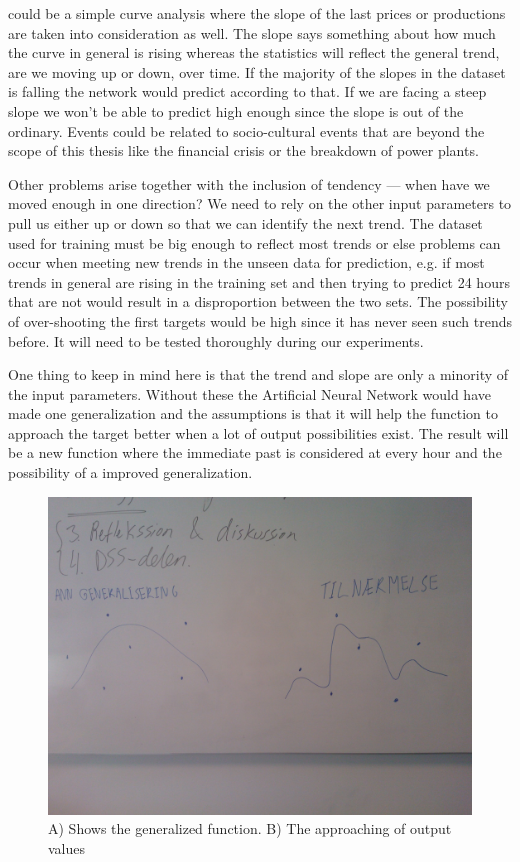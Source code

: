could be a simple curve analysis where the slope of the last prices or productions are taken into consideration as well. The slope says something about how much the curve in general is rising whereas the statistics will reflect the general trend, are we moving up or down, over time. If the majority of the slopes in the dataset is falling the network would predict according to that. If we are facing a steep slope we won't be able to predict high enough since the slope is out of the ordinary. Events could be related to socio-cultural events that are beyond the scope of this thesis like the financial crisis or the breakdown of power plants.

Other problems arise together with the inclusion of tendency --- when have we moved enough in one direction? We need to rely on the other input parameters to pull us either up or down so that we can identify the next trend. The dataset used for training must be big enough to reflect most trends or else problems can occur when meeting new trends in the unseen data for prediction, e.g. if most trends in general are rising in the training set and then trying to predict 24 hours that are not would result in a disproportion between the two sets. The possibility of over-shooting the first targets would be high since it has never seen such trends before.    It will need to be tested thoroughly during our experiments. 

One thing to keep in mind here is that the trend and slope are only a minority of the input parameters. Without these the Artificial Neural Network would have made one generalization and the assumptions is that it will help the function to approach the target better when a lot of output possibilities exist. The result will be a new function where the immediate past is considered at every hour and the possibility of a improved generalization.

\begin{figure}[H]
\centering
\includegraphics[width=0.99\linewidth,natwidth=898,natheight=587]{billeder/WP_000057.jpg}
\caption{A) Shows the generalized function. B) The approaching of output values}
\label{fig:WP}
\end{figure}

